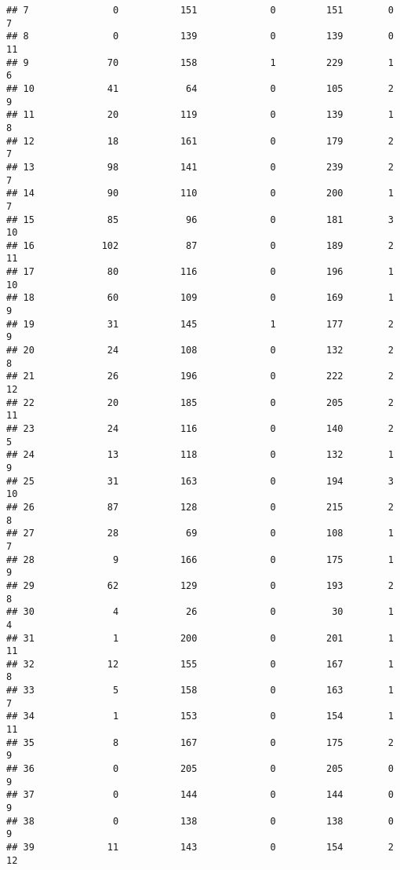 \documentclass[]{article}
\begin{document}
\begin{verbatim}
## 7               0           151             0         151        0        7
## 8               0           139             0         139        0       11
## 9              70           158             1         229        1        6
## 10             41            64             0         105        2        9
## 11             20           119             0         139        1        8
## 12             18           161             0         179        2        7
## 13             98           141             0         239        2        7
## 14             90           110             0         200        1        7
## 15             85            96             0         181        3       10
## 16            102            87             0         189        2       11
## 17             80           116             0         196        1       10
## 18             60           109             0         169        1        9
## 19             31           145             1         177        2        9
## 20             24           108             0         132        2        8
## 21             26           196             0         222        2       12
## 22             20           185             0         205        2       11
## 23             24           116             0         140        2        5
## 24             13           118             0         132        1        9
## 25             31           163             0         194        3       10
## 26             87           128             0         215        2        8
## 27             28            69             0         108        1        7
## 28              9           166             0         175        1        9
## 29             62           129             0         193        2        8
## 30              4            26             0          30        1        4
## 31              1           200             0         201        1       11
## 32             12           155             0         167        1        8
## 33              5           158             0         163        1        7
## 34              1           153             0         154        1       11
## 35              8           167             0         175        2        9
## 36              0           205             0         205        0        9
## 37              0           144             0         144        0        9
## 38              0           138             0         138        0        9
## 39             11           143             0         154        2       12

\end{verbatim}
\end{document}
